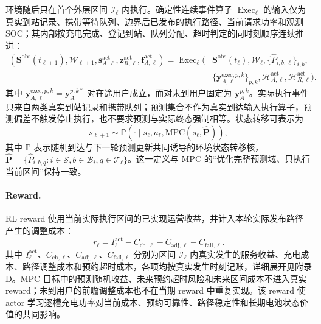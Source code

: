 \documentclass[12pt,a4paper,UTF8]{ctexart}
\begin{document}
环境随后只在首个外层区间 $\mathcal I_\ell$ 内执行。确定性连续事件算子 $\operatorname{Exec}_\ell$ 的输入仅为真实到站记录、携带等待队列、边界后已发布的执行路径、当前请求功率和观测 SOC；其内部按充电完成、登记到站、队列分配、超时判定的同时刻顺序连续推进：
\begin{equation}
\begin{aligned}
(\mathbf S^{\mathrm{obs}}(t_{\ell+1}),\mathcal W_{\ell+1},
\mathbf s_{A,\ell}^{\mathrm{act}},\mathbf z_{R,\ell}^{\mathrm{act}},
\mathbf f_{A,\ell}^{\mathrm{act}})
=\operatorname{Exec}_\ell\!\Big(&
\mathbf S^{\mathrm{obs}}(t_\ell),\mathcal W_\ell,
\{\widehat P_{i,b,\ell}\}_{i,b},\\
&\{\mathbf y_{A,\ell}^{\mathrm{exec},p,k}\}_{p,k},
\mathcal H_{A,\ell}^{\mathrm{act}},\mathcal H_{R,\ell}^{\mathrm{act}}
\Big).
\end{aligned}
\label{eq:actual_execution_operator}
\end{equation}
其中 $\mathbf y_{A,\ell}^{\mathrm{exec},p,k}=\mathbf y_A^{p,k*}$ 对在途用户成立，而对未到用户固定为 $\bar{\mathbf y}_{A}^{p,k}$。实际执行事件只来自两类真实到站记录和携带队列；预测集合不作为真实到达输入执行算子，预测偏差不触发停止执行，也不要求预测与实际终态强制相等。状态转移可表示为
\begin{equation}
s_{\ell+1}
\sim
\mathbb P\!\left(
\cdot\mid
s_\ell,a_\ell,
\mathrm{MPC}(s_\ell,\widehat{\mathbf P})
\right),
\label{eq:rl_transition}
\end{equation}
其中 $\mathbb P$ 表示随机到达与下一轮预测更新共同诱导的环境状态转移核，$\widehat{\mathbf P}=\{\widehat P_{i,b,q}:i\in\mathcal S,b\in\mathcal B_i,q\in\mathcal T_\ell\}$。这一定义与 MPC 的“优化完整预测域、只执行当前区间”保持一致。

\paragraph{Reward.}
RL reward 使用当前实际执行区间的已实现运营收益，并计入本轮实际发布路径产生的调整成本：
\begin{equation}
r_\ell
=
I_\ell^{\mathrm{act}}
-C_{\mathrm{ch},\ell}
-C_{\mathrm{adj},\ell}
-C_{\mathrm{fail},\ell}.
\label{eq:rl_reward}
\end{equation}
其中 $I_\ell^{\mathrm{act}}$、$C_{\mathrm{ch},\ell}$、$C_{\mathrm{adj},\ell}$、$C_{\mathrm{fail},\ell}$ 分别为区间 $\mathcal I_\ell$ 内真实发生的服务收益、充电成本、路径调整成本和预约超时成本，各项均按真实发生时刻记账，详细展开见附录 D。MPC 目标中的预测随机收益、未来预约超时风险和未来区间成本不进入真实 reward；未到用户的前瞻调整成本也不在当期 reward 中重复实现。该 reward 使 actor 学习逐槽充电功率对当前成本、预约可靠性、路径稳定性和长期电池状态价值的共同影响。
\end{document}
